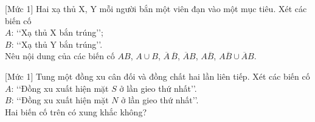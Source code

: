 \begin{bt}%
[Mức 1]%
	Hai xạ thủ X, Y mỗi người bắn một viên đạn vào một mục tiêu. Xét các biến cố\\
	$A$: \lq\lq Xạ thủ X bắn trúng\rq\rq; \\
	$B$: \lq\lq Xạ thủ Y bắn trúng\rq\rq.\\
	Nêu nội dung của các biến cố $AB$, $A\cup B$, $\overline{A}\,\overline{B}$, $\overline{A}B$, $A\overline{B}$, $A\overline{B} \cup \overline{A}B$.
\end{bt}

\begin{bt}%
[Mức 1]
	Tung một đồng xu cân đối và đồng chất hai lần liên tiếp. Xét các biến cố\\
	$A$: \lq\lq Đồng xu xuất hiện mặt $S$ ở lần gieo thứ nhất\rq\rq.\\
	$B$: \lq\lq Đồng xu xuất hiện mặt $N$ ở lần gieo thứ nhất\rq\rq.\\
	Hai biến cố trên có xung khắc không?
\end{bt}

